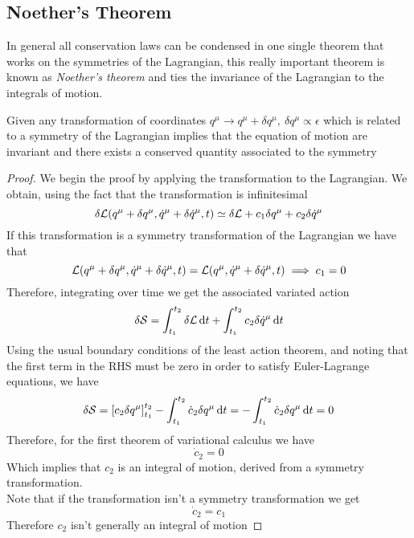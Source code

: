 \documentclass[../admech.tex]{subfiles}
\begin{document}
\subsection{Noether's Theorem}
In general all conservation laws can be condensed in one single theorem that works on the symmetries of the Lagrangian, this really important theorem is known as \emph{Noether's theorem} and ties the invariance of the Lagrangian to the integrals of motion.\\
\begin{thm}
	Given any transformation of coordinates $q^\mu\to q^\mu+\delta q^\mu,\ \delta q^\mu\propto\epsilon$ which is related to a symmetry of the Lagrangian implies that the equation of motion are invariant and there exists a conserved quantity associated to the symmetry
\end{thm}
\begin{proof}
	We begin the proof by applying the transformation to the Lagrangian. We obtain, using the fact that the transformation is infinitesimal
	\begin{equation*}
		\delta\mathcal{L}(q^\mu+\delta q^\mu,\dot{q}^\mu+\delta\dot{q}^\mu,t)\simeq\delta\mathcal{L}+c_1\delta q^\mu+c_2\delta\dot{q}^\mu
	\end{equation*}
	If this transformation is a symmetry transformation of the Lagrangian we have that
	\begin{equation*}
		\mathcal{L}(q^\mu+\delta q^\mu,\dot{q}^\mu+\delta\dot{q}^\mu,t)=\mathcal{L}(q^\mu,\dot{q}^\mu+\delta\dot{q}^\mu,t)\implies c_1=0
	\end{equation*}
	Therefore, integrating over time we get the associated variated action
	\begin{equation*}
		\delta\mathcal{S}=\int_{t_1}^{t_2}\delta\mathcal{L}\dd{t}+\int_{t_1}^{t_2}c_2\delta\dot{q}^\mu\dd{t}
	\end{equation*}
	Using the usual boundary conditions of the least action theorem, and noting that the first term in the RHS must be zero in order to satisfy Euler-Lagrange equations, we have
	\begin{equation*}
		\delta\mathcal{S}=\left[c_2\delta q^\mu\right]_{t_1}^{t_2}-\int_{t_1}^{t_2}\dot{c}_2\delta q^\mu\dd{t}=-\int_{t_1}^{t_2}\dot{c}_2\delta q^\mu\dd{t}=0
	\end{equation*}
	Therefore, for the first theorem of variational calculus we have
	\begin{equation*}
		\dot{c}_2=0
	\end{equation*}
	Which implies that $c_2$ is an integral of motion, derived from a symmetry transformation.\\
	Note that if the transformation isn't a symmetry transformation we get
	\begin{equation*}
		\dot{c}_2=c_1
	\end{equation*}
	Therefore $c_2$ isn't generally an integral of motion
\end{proof}
\end{document}
